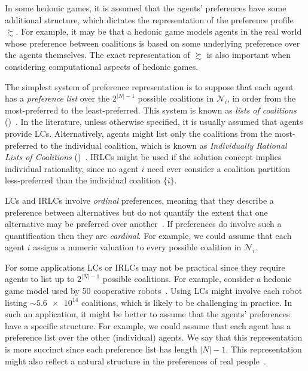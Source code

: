 In some hedonic games, it is assumed that the agents' preferences have some additional structure, which dictates the representation of the preference profile $\succsim$. For example, it may be that a hedonic game models agents in the real world whose preference between coalitions is based on some underlying preference over the agents themselves. The exact representation of $\succsim$ is also important when considering computational aspects of hedonic games.

The simplest system of preference representation is to suppose that each agent has a \emph{preference list} over the $2^{|N|-1}$ possible coalitions in $\mathcal{N}_i$, in order from the most-preferred to the least-preferred. This system is known as \emph{lists of coalitions} ()~\cite{EW09}. In the literature, unless otherwise specified, it is usually assumed that agents provide LCs. Alternatively, agents might list only the coalitions from the most-preferred to the individual coalition, which is known as \emph{Individually Rational Lists of Coalitions} ()~\cite{EW09}. IRLCs might be used if the solution concept implies individual rationality, since no agent $i$ need ever consider a coalition partition less-preferred than the individual coalition $\{i\}$.

LCs and IRLCs involve \emph{ordinal} preferences, meaning that they describe a preference between alternatives but do not quantify the extent that one alternative may be preferred over another~\cite{AMUP}. If preferences do involve such a quantification then they are \emph{cardinal}. For example, we could assume that each agent $i$ assigns a numeric valuation to every possible coalition in $\mathcal{N}_i$.


For some applications LCs or IRLCs may not be practical since they require agents to list up to $2^{|N|-1}$ possible coalitions. For example, consider a hedonic game model used by 50 cooperative robots~\cite{IJangHedonicGamesRobots2018}. Using LCs might involve each robot listing ${\sim}\num{5.6e+14}$ coalitions, which is likely to be challenging in practice. In such an application, it might be better to assume that the agents' preferences have a specific structure. For example, we could assume that each agent has a preference list over the other (individual) agents. We say that this representation is more succinct since each preference list has length $|N| - 1$. This representation might also reflect a natural structure in the preferences of real people~\cite{CH02}.

